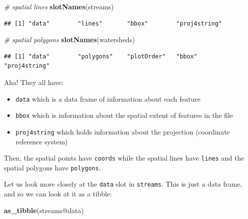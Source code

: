 \documentclass[]{book}
\newenvironment{Shaded}{\begin{snugshade}}{\end{snugshade}}
\newcommand{\KeywordTok}[1]{\textcolor[rgb]{0.13,0.29,0.53}{\textbf{{#1}}}}
\newcommand{\CommentTok}[1]{\textcolor[rgb]{0.56,0.35,0.01}{\textit{{#1}}}}
\newcommand{\NormalTok}[1]{{#1}}
\providecommand{\tightlist}{%
  \setlength{\itemsep}{0pt}\setlength{\parskip}{0pt}}
\theoremstyle{definition}
\theoremstyle{definition}
\theoremstyle{remark}
\begin{document}
\begin{Shaded}
\begin{Highlighting}[]
\CommentTok{# spatial lines}
\KeywordTok{slotNames}\NormalTok{(streams)}
\end{Highlighting}
\end{Shaded}

\begin{verbatim}
## [1] "data"        "lines"       "bbox"        "proj4string"
\end{verbatim}

\begin{Shaded}
\begin{Highlighting}[]
\CommentTok{# spatial polygons}
\KeywordTok{slotNames}\NormalTok{(watersheds)}
\end{Highlighting}
\end{Shaded}

\begin{verbatim}
## [1] "data"        "polygons"    "plotOrder"   "bbox"        "proj4string"
\end{verbatim}

Aha! They all have:

\begin{itemize}
\tightlist
\item
  \texttt{data} which is a data frame of information about each feature
\item
  \texttt{bbox} which is information about the spatial extent of
  features in the file
\item
  \texttt{proj4string} which holds information about the projection
  (coordinate reference system)
\end{itemize}

Then, the spatial points have \texttt{coords} while the spatial lines
have \texttt{lines} and the spatial polygons have \texttt{polygons}.

Let us look more closely at the \texttt{data} slot in \texttt{streams}.
This is just a data frame, and so we can look at it as a tibble:

\begin{Shaded}
\begin{Highlighting}[]
\KeywordTok{as_tibble}\NormalTok{(streams@data)}
\end{Highlighting}
\end{Shaded}
\end{document}
